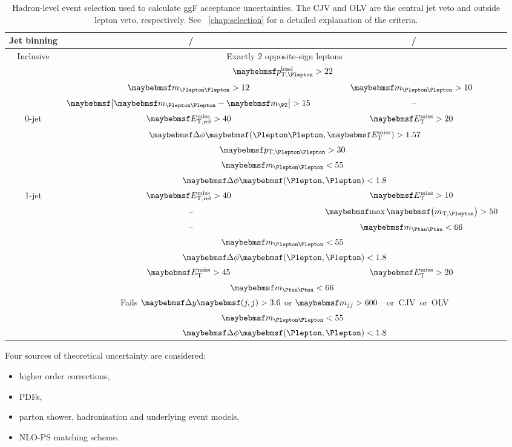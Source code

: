 \begin{table}
	\begin{tabular}{ccc}
		Jet binning & \eech/\mmch & \emch/\mech \\
		\hline
		Inclusive & \multicolumn{2}{c}{Exactly 2 opposite-sign leptons} \\
		& \multicolumn{2}{c}{\unit{$\ptleadlep > 22$}{\GeV}} \\
		& \unit{$\mll > 12$}{\GeV} & \unit{$\mll > 10$}{\GeV} \\
		& \unit{$\mods{\mll - \mZ} > 15$}{\GeV} & -- \\
		\hline
		0-jet & \unit{$\metrel > 40$}{\GeV} & \unit{$\met > 20$}{\GeV} \\
		& \multicolumn{2}{c}{$\dphillmet > 1.57$} \\
		& \multicolumn{2}{c}{\unit{$\ptll > 30$}{\GeV}} \\
		& \multicolumn{2}{c}{\unit{$\mll < 55$}{\GeV}} \\
		& \multicolumn{2}{c}{$\dphill < 1.8$} \\
		\hline
		1-jet & \unit{$\metrel > 40$}{\GeV} & \unit{$\met > 10$}{\GeV} \\
		& -- & \unit{$\maxmtw > 50$}{\GeV} \\
		& -- & \unit{$\mtautau < 66$}{\GeV} \\
		& \multicolumn{2}{c}{\unit{$\mll < 55$}{\GeV}} \\
		& \multicolumn{2}{c}{$\dphill < 1.8$} \\
		\hline
		\twojet & \unit{$\met > 45$}{\GeV} & \unit{$\met > 20$}{\GeV} \\
		& \multicolumn{2}{c}{\unit{$\mtautau < 66$}{\GeV}} \\
		& \multicolumn{2}{c}{Fails $\dyjj > 3.6$ or \unit{$\mjj > 600$}{\GeV} or CJV or OLV} \\
		& \multicolumn{2}{c}{\unit{$\mll < 55$}{\GeV}} \\
		& \multicolumn{2}{c}{$\dphill < 1.8$} \\
	\end{tabular}
	\caption{Hadron-level event selection used to calculate ggF acceptance uncertainties. 
	The CJV and OLV are the central jet veto and outside lepton veto, respectively. See 
	\Chapter~\ref{chap:selection} for a detailed explanation of the criteria.}
	\label{tab:signal:acc_truthselection}
\end{table}

Four sources of theoretical uncertainty are considered:
\begin{itemize}[noitemsep,nolistsep]
	\item higher order corrections,
	\item \acp{PDF},
	\item parton shower, hadronisation and underlying event models,
	\item NLO-PS matching scheme.
\end{itemize}

